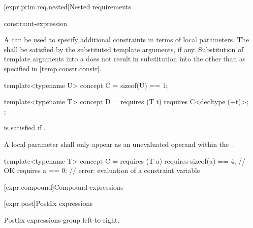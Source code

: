 [expr.prim.req.nested]{Nested requirements}
%

\begin{bnf}
\br
     constraint-expression \terminal{;}
\end{bnf}

\pnum
A  can be used
to specify additional constraints in terms of local parameters.
The 
shall be satisfied
by the substituted template arguments, if any.
Substitution of template arguments into a 
does not result in substitution into the 
other than as specified in \ref{temp.constr.constr}.
\begin{example}
\begin{codeblock}
template<typename U> concept C = sizeof(U) == 1;

template<typename T> concept D = requires (T t) {
  requires C<decltype (+t)>;
};
\end{codeblock}
 is satisfied if .
\end{example}

\pnum
A local parameter shall only appear as an unevaluated operand
within the .
\begin{example}
\begin{codeblock}
template<typename T> concept C = requires (T a) {
  requires sizeof(a) == 4;      // OK
  requires a == 0;              // error: evaluation of a constraint variable
}
\end{codeblock}
\end{example}

[expr.compound]{Compound expressions}

[expr.post]{Postfix expressions}%

\pnum
Postfix expressions group left-to-right.

